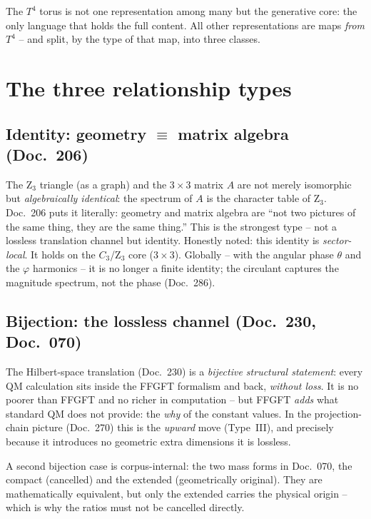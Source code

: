 \begin{keyresult}
The $T^4$ torus is not one representation among many but the generative core: the only language that
holds the full content. All other representations are maps \emph{from} $T^4$ -- and split, by the
type of that map, into three classes.
\end{keyresult}

\section{The three relationship types}

\subsection{Identity: geometry $\equiv$ matrix algebra (Doc.~206)}
The Z$_3$ triangle (as a graph) and the $3\times3$ matrix $A$ are not merely isomorphic but
\emph{algebraically identical}: the spectrum of $A$ is the character table of Z$_3$. Doc.~206 puts it
literally: geometry and matrix algebra are \enquote{not two pictures of the same thing, they are the
same thing.} This is the strongest type -- not a lossless translation channel but identity. Honestly
noted: this identity is \emph{sector-local}. It holds on the $C_3$/Z$_3$ core ($3\times3$). Globally
-- with the angular phase $\theta$ and the $\varphi$ harmonics -- it is no longer a finite identity;
the circulant captures the magnitude spectrum, not the phase (Doc.~286).

\subsection{Bijection: the lossless channel (Doc.~230, Doc.~070)}
The Hilbert-space translation (Doc.~230) is a \emph{bijective structural statement}: every QM
calculation sits inside the FFGFT formalism and back, \emph{without loss}. It is no poorer than FFGFT
and no richer in computation -- but FFGFT \emph{adds} what standard QM does not provide: the
\emph{why} of the constant values. In the projection-chain picture (Doc.~270) this is the
\emph{upward} move (Type~III), and precisely because it introduces no geometric extra dimensions it is
lossless.

A second bijection case is corpus-internal: the two mass forms in Doc.~070, the compact (cancelled)
and the extended (geometrically original). They are mathematically equivalent, but only the extended
carries the physical origin -- which is why the ratios must not be cancelled directly.

